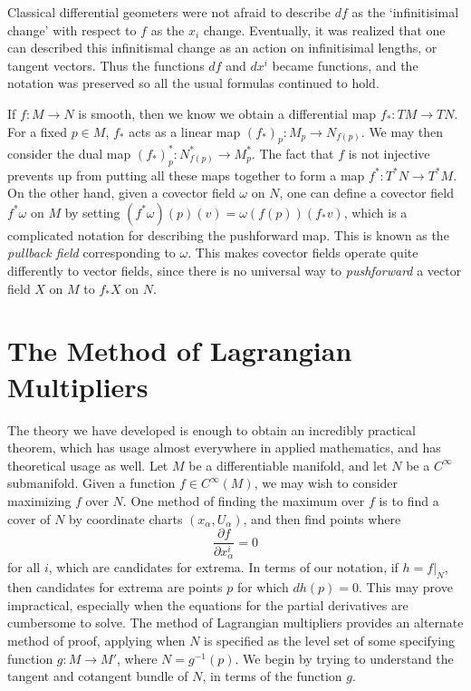 Classical differential geometers were not afraid to describe $df$ as the `infinitisimal change' with respect to $f$ as the $x_i$ change. Eventually, it was realized that one can described this infinitismal change as an action on infinitisimal lengths, or tangent vectors. Thus the functions $df$ and $dx^i$ became functions, and the notation was preserved so all the usual formulas continued to hold.

If $f: M \to N$ is smooth, then we know we obtain a differential map $f_*: TM \to TN$. For a fixed $p \in M$, $f_*$ acts as a linear map $(f_*)_p: M_p \to N_{f(p)}$. We may then consider the dual map $(f_*)_p^*: N^*_{f(p)} \to M^*_p$. The fact that $f$ is not injective prevents up from putting all these maps together to form a map $f^*: T^*N \to T^*M$. On the other hand, given a covector field $\omega$ on $N$, one can define a covector field $f^* \omega$ on $M$ by setting $(f^* \omega)(p)(v) = \omega(f(p))(f_* v)$, which is a complicated notation for describing the pushforward map. This is known as the {\it pullback field} corresponding to $\omega$. This makes covector fields operate quite differently to vector fields, since there is no universal way to {\it pushforward} a vector field $X$ on $M$ to $f_*X$ on $N$.

\section{The Method of Lagrangian Multipliers}

The theory we have developed is enough to obtain an incredibly practical theorem, which has usage almost everywhere in applied mathematics, and has theoretical usage as well. Let $M$ be a differentiable manifold, and let $N$ be a $C^\infty$ submanifold. Given a function $f \in C^\infty(M)$, we may wish to consider maximizing $f$ over $N$. One method of finding the maximum over $f$ is to find a cover of $N$ by coordinate charts $(x_\alpha,U_\alpha)$, and then find points where
%
\[ \frac{\partial f}{\partial x^i_\alpha} = 0 \]
%
for all $i$, which are candidates for extrema. In terms of our notation, if $h = f|_N$, then candidates for extrema are points $p$ for which $dh(p) = 0$. This may prove impractical, especially when the equations for the partial derivatives are cumbersome to solve. The method of Lagrangian multipliers provides an alternate method of proof, applying when $N$ is specified as the level set of some specifying function $g: M \to M'$, where $N = g^{-1}(p)$. We begin by trying to understand the tangent and cotangent bundle of $N$, in terms of the function $g$.

